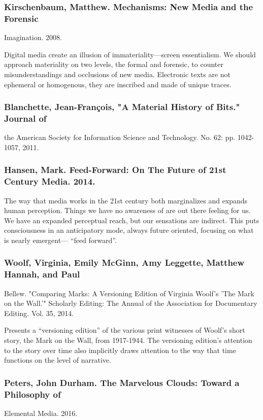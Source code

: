 \documentclass[11pt]{article}
\begin{document}
\subsubsection{Kirschenbaum, Matthew. Mechanisms: New Media and the Forensic}
\label{sec:orgfdf55b0}
Imagination. 2008.

Digital media create an illusion of immateriality---screen
essentialism. We should approach materiality on two levels, the formal
and forensic, to counter misunderstandings and occlusions of new
media. Electronic texts are not ephemeral or homogenous, they are
inscribed and made of unique traces.

\subsubsection{Blanchette, Jean-François, "A Material History of Bits." Journal of}
\label{sec:org1e8dc0d}
the American Society for Information Science and Technology. No. 62:
pp. 1042-1057, 2011.

\subsubsection{Hansen, Mark. Feed-Forward: On The Future of 21st Century Media. 2014.}
\label{sec:org1103420}

The way that media works in the 21st century both marginalizes and
expands human perception. Things we have no awareness of are out there
feeling for us. We have an expanded perceptual reach, but our
sensations are indirect. This puts consciousness in an anticipatory
mode, always future oriented, focusing on what is nearly emergent---
“feed forward”.

\subsubsection{Woolf, Virginia, Emily McGinn, Amy Leggette, Matthew Hannah, and Paul}
\label{sec:org51a2996}
Bellew. "Comparing Marks: A Versioning Edition of Virginia Woolf's
'The Mark on the Wall.'" Scholarly Editing: The Annual of the
Association for Documentary Editing. Vol. 35, 2014.

Presents a “versioning edition” of the various print witnesses of
Woolf’s short story, the Mark on the Wall, from 1917-1944.  The
versioning edition’s attention to the story over time also implicitly
draws attention to the way that time functions on the level of
narrative.

\subsubsection{Peters, John Durham. The Marvelous Clouds: Toward a Philosophy of}
\label{sec:org0cf0091}
Elemental Media. 2016.
\end{document}
